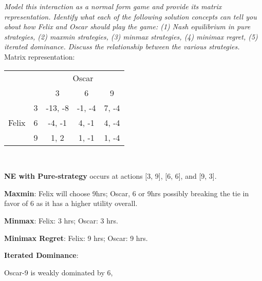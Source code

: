 \documentclass[12pt]{amsart}
\begin{document}
\textit{Model this interaction as a normal form game and provide its matrix representation.
	Identify what each of the following solution concepts can tell you about how Felix and Oscar
	should play the game: (1) Nash equilibrium in pure strategies, (2) maxmin strategies, (3)
	minmax strategies, (4) minimax regret, (5) iterated dominance. Discuss the relationship
	between the various strategies.} \\
	
	Matrix representation: \\
	
	\begin{center}
		\def\arraystretch{1.25}%
		\begin{tabular}{ccccc}
			&                        & \multicolumn{3}{c}{Oscar}                                                               \\
			& \multicolumn{1}{c|}{}  & \multicolumn{1}{c|}{3}       & \multicolumn{1}{c|}{6}      & \multicolumn{1}{c|}{9}     \\ \cline{2-5} 
			\multirow{3}{*}{Felix} & \multicolumn{1}{c|}{3} & \multicolumn{1}{c|}{-13, -8} & \multicolumn{1}{c|}{-1, -4} & \multicolumn{1}{c|}{7, -4} \\ \cline{2-5} 
			& \multicolumn{1}{c|}{6} & \multicolumn{1}{c|}{-4, -1}  & \multicolumn{1}{c|}{4, -1}  & \multicolumn{1}{c|}{4, -4} \\ \cline{2-5} 
			& \multicolumn{1}{c|}{9} & \multicolumn{1}{c|}{1, 2}    & \multicolumn{1}{c|}{1, -1}  & \multicolumn{1}{c|}{1, -4} \\ \cline{2-5} 
		\end{tabular} \\[3ex]
	\end{center}
	
	\textbf{NE with Pure-strategy} occurs at actions [3, 9], [6, 6], and [9, 3].
	
	\textbf{Maxmin}:
	Felix will choose 9hrs;	
	Oscar, 6 or 9hrs possibly breaking the tie in favor of 6 as it has a higher utility overall.
	
	\textbf{Minmax}:
	Felix: 3 hrs; 
	Oscar: 3 hrs.
	
	\textbf{Minimax Regret}:
	Felix: 9 hrs;
	Oscar: 9 hrs.
	
	\textbf{Iterated Dominance}:
	
	Oscar-9 is weakly dominated by 6,
	
\end{document}
